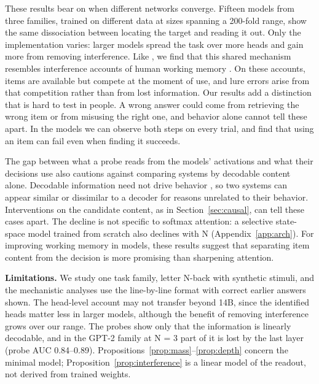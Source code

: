 \documentclass{article}
\begin{document}
These results bear on when different networks converge. Fifteen models from three families, trained on different data at sizes spanning a 200-fold range, show the same dissociation between locating the target and reading it out. Only the implementation varies: larger models spread the task over more heads and gain more from removing interference. Like \citet{xiong2026superposition}, we find that this shared mechanism resembles interference accounts of human working memory \citep{oberauer2012interference,szmalec2011interference,engle2002executive}. On these accounts, items are available but compete at the moment of use, and lure errors arise from that competition rather than from lost information. Our results add a distinction that is hard to test in people. A wrong answer could come from retrieving the wrong item or from misusing the right one, and behavior alone cannot tell these apart. In the models we can observe both steps on every trial, and find that using an item can fail even when finding it succeeds.

The gap between what a probe reads from the models' activations and what their decisions use also cautions against comparing systems by decodable content alone. Decodable information need not drive behavior \citep{dewit2016neuroimaging,ravichander2021probing}, so two systems can appear similar or dissimilar to a decoder for reasons unrelated to their behavior. Interventions on the candidate content, as in Section~\ref{sec:causal}, can tell these cases apart. The decline is not specific to softmax attention: a selective state-space model trained from scratch also declines with N (Appendix~\ref{app:arch}). For improving working memory in models, these results suggest that separating item content from the decision is more promising than sharpening attention.

\textbf{Limitations.} We study one task family, letter N-back with synthetic stimuli, and the mechanistic analyses use the line-by-line format with correct earlier answers shown. The head-level account may not transfer beyond 14B, since the identified heads matter less in larger models, although the benefit of removing interference grows over our range. The probes show only that the information is linearly decodable, and in the GPT-2 family at N = 3 part of it is lost by the last layer (probe AUC 0.84--0.89). Propositions~\ref{prop:mass}--\ref{prop:depth} concern the minimal model; Proposition~\ref{prop:interference} is a linear model of the readout, not derived from trained weights.
\end{document}
